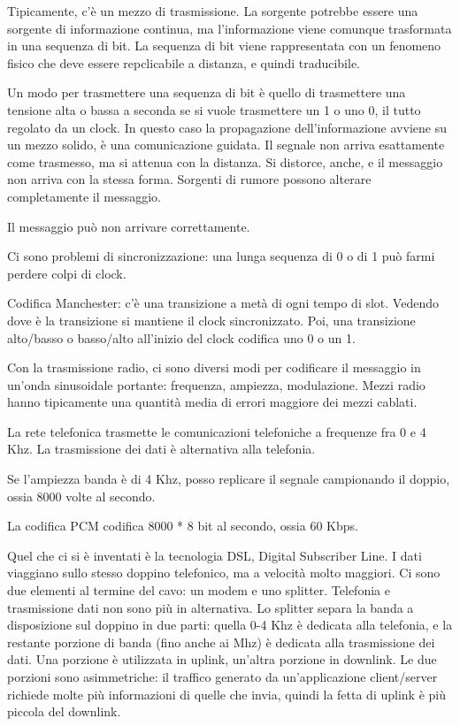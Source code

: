 Tipicamente, c'\`e un mezzo di trasmissione. La sorgente potrebbe essere una sorgente di informazione continua, ma l'informazione viene comunque trasformata in una sequenza di bit. La sequenza di bit viene rappresentata con un fenomeno fisico che deve essere repclicabile a distanza, e quindi traducibile. 

Un modo per trasmettere una sequenza di bit \`e quello di trasmettere una tensione alta o bassa a seconda se si vuole trasmettere un 1 o uno 0, il tutto regolato da un clock. In questo caso la propagazione dell'informazione avviene su un mezzo solido, \`e una comunicazione guidata. Il segnale non arriva esattamente come trasmesso, ma si attenua con la distanza. Si distorce, anche, e il messaggio non arriva con la stessa forma. Sorgenti di rumore possono alterare completamente il messaggio.

Il messaggio pu\`o non arrivare correttamente.


Ci sono problemi di sincronizzazione: una lunga sequenza di 0 o di 1 pu\`o farmi perdere colpi di clock. 

Codifica Manchester: c'\`e una transizione a met\`a di ogni tempo di slot. Vedendo dove \`e la transizione si mantiene il clock sincronizzato. Poi, una transizione alto/basso o basso/alto all'inizio del clock codifica uno 0 o un 1.

Con la trasmissione radio, ci sono diversi modi per codificare il messaggio in un'onda sinusoidale portante: frequenza, ampiezza, modulazione. Mezzi radio hanno tipicamente una quantit\`a media di errori maggiore dei mezzi cablati.

La rete telefonica trasmette le comunicazioni telefoniche a frequenze fra 0 e 4 Khz. La trasmissione dei dati \`e alternativa alla telefonia.

Se l'ampiezza banda \`e di 4 Khz, posso replicare il segnale campionando il doppio, ossia 8000 volte al secondo.

La codifica PCM codifica 8000 * 8 bit al secondo, ossia 60 Kbps.

Quel che ci si \`e inventati \`e la tecnologia DSL, Digital Subscriber Line. I dati viaggiano sullo stesso doppino telefonico, ma a velocit\`a molto maggiori. Ci sono due elementi al termine del cavo: un modem e uno splitter. Telefonia e trasmissione dati non sono pi\`u in alternativa. Lo splitter separa la banda a disposizione sul doppino in due parti: quella 0-4 Khz \`e dedicata alla telefonia, e la restante porzione di banda (fino anche ai Mhz) \`e dedicata alla trasmissione dei dati. Una porzione \`e utilizzata in uplink, un'altra porzione in downlink. Le due porzioni sono asimmetriche: il traffico generato da un'applicazione client/server richiede molte pi\`u informazioni di quelle che invia, quindi la fetta di uplink \`e pi\`u piccola del downlink.

